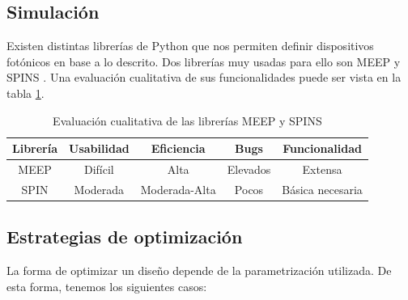 \subsection{Simulación}

Existen distintas librerías de Python que nos permiten definir dispositivos fotónicos en base a lo descrito. 
Dos librerías muy usadas para ello son MEEP \citep{Oskooi2010} y SPINS \citep{Su2020}. 
Una evaluación cualitativa de sus funcionalidades puede ser vista en la tabla \ref{tab:simulation}.

\begin{table}[ht]
    \centering
    \begin{tabular}{|c|c|c|c|c|}
    \hline 
    Librería &  Usabilidad & Eficiencia & Bugs & Funcionalidad \\
    \hline 
    MEEP &  Difícil & Alta & Elevados & Extensa \\
    SPIN &  Moderada  & Moderada-Alta & Pocos & Básica necesaria \\
    \hline 
    \end{tabular}
    \caption{Evaluación cualitativa de las librerías MEEP y SPINS}
    \label{tab:simulation}
\end{table}


\subsection{Estrategias de optimización}

La forma de optimizar un diseño depende de la parametrización utilizada. De esta forma, tenemos los siguientes casos:

